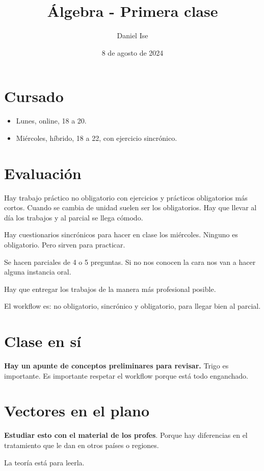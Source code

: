 \documentclass{article}
\title{Álgebra - Primera clase}
\author{Daniel Ise}
\date{8 de agosto de 2024}
\begin{document}
\maketitle

\section*{Cursado}

\begin{itemize}
    \item Lunes, online, 18 a 20.
    \item Miércoles, híbrido, 18 a 22, con ejercicio sincrónico.
\end{itemize}

\section*{Evaluación}

Hay trabajo práctico no obligatorio con ejercicios y prácticos obligatorios más cortos.
Cuando se cambia de unidad suelen ser los obligatorios. Hay que llevar al día los
trabajos y al parcial se llega cómodo.

Hay cuestionarios sincrónicos para hacer en clase los miércoles. Ninguno es obligatorio.
Pero sirven para practicar.

Se hacen parciales de 4 o 5 preguntas. Si no nos conocen la cara nos van a hacer
alguna instancia oral.

Hay que entregar los trabajos de la manera más profesional posible.

El workflow es: no obligatorio, sincrónico y obligatorio, para llegar bien al parcial.

\section*{Clase en sí}

\textbf{Hay un apunte de conceptos preliminares para revisar.} Trigo es importante.
Es importante respetar el workflow porque está todo enganchado.

\section*{Vectores en el plano}

\textbf{Estudiar esto con el material de los profes}. Porque hay diferencias en el
tratamiento que le dan en otros países o regiones.

La teoría está para leerla.
\end{document}

